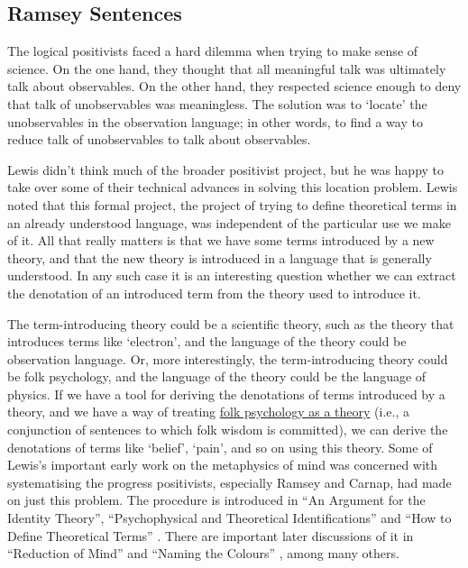 \subsection{Ramsey Sentences}

The logical positivists faced a hard dilemma when trying to make sense of science. On the one hand, they thought that all meaningful talk was ultimately talk about observables. On the other hand, they respected science enough to deny that talk of unobservables was meaningless. The solution was to `locate' the unobservables in the observation language; in other words, to find a way to reduce talk of unobservables to talk about observables.

Lewis didn't think much of the broader positivist project, but he was happy to take over some of their technical advances in solving this location problem. Lewis noted that this formal project, the project of trying to define theoretical terms in an already understood language, was independent of the particular use we make of it. All that really matters is that we have some terms introduced by a new theory, and that the new theory is introduced in a language that is generally understood. In any such case it is an interesting question whether we can extract the denotation of an introduced term from the theory used to introduce it.

The term-introducing theory could be a scientific theory, such as the theory that introduces terms like `electron', and the language of the theory could be observation language. Or, more interestingly, the term-introducing theory could be folk psychology, and the language of the theory could be the language of physics. If we have a tool for deriving the denotations of terms introduced by a theory, and we have a way of treating \href{http://plato.stanford.edu/folkpsych-theory/}{folk psychology as a theory} (i.e., a conjunction of sentences to which folk wisdom is committed), we can derive the denotations of terms like `belief', `pain', and so on using this theory. Some of Lewis's important early work on the metaphysics of mind was concerned with systematising the progress positivists, especially Ramsey and Carnap, had made on just this problem. The procedure is introduced in ``An Argument for the Identity Theory'', ``Psychophysical and Theoretical Identifications'' \citeyearpar{Lewis1972a} and ``How to Define Theoretical Terms'' \citeyearpar{Lewis1970c}. There are important later discussions of it in ``Reduction of Mind'' and ``Naming the Colours'' \citeyearpar{Lewis1997c}, among many others.

